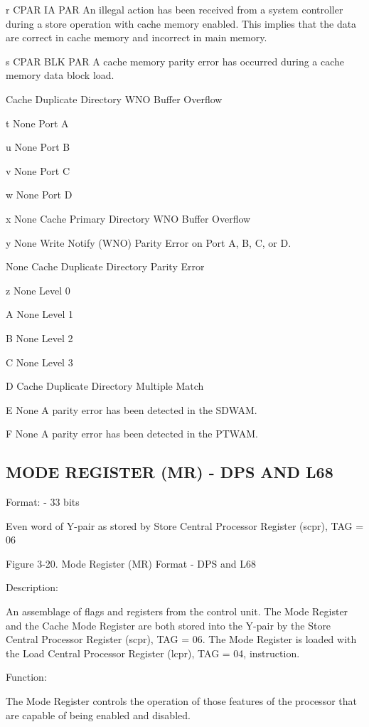 r CPAR IA PAR An illegal action has been received from a system controller during a store operation with cache memory enabled. This implies that the data are correct in cache memory and incorrect in main memory.

s CPAR BLK PAR A cache memory parity error has occurred during a cache memory data block load.

Cache Duplicate Directory WNO Buffer Overflow

t None Port A

u None Port B

v None Port C

w None Port D

x None Cache Primary Directory WNO Buffer Overflow

y None Write Notify (WNO) Parity Error on Port A, B, C, or D.

None Cache Duplicate Directory Parity Error

z None Level 0

A None Level 1

B None Level 2

C None Level 3

D Cache Duplicate Directory Multiple Match

E None A parity error has been detected in the SDWAM.

F None A parity error has been detected in the PTWAM.

\subsection{MODE REGISTER (MR) - DPS AND L68}

Format: - 33 bits

Even word of Y-pair as stored by Store Central Processor Register (scpr), TAG = 06

Figure 3-20. Mode Register (MR) Format - DPS and L68

Description:

An assemblage of flags and registers from the control unit. The Mode Register
and the Cache Mode Register are both stored into the Y-pair by the Store
Central Processor Register (scpr), TAG = 06. The Mode Register is loaded with
the Load Central Processor Register (lcpr), TAG = 04, instruction.

Function:

The Mode Register controls the operation of those features of the processor
that are capable of being enabled and disabled.

